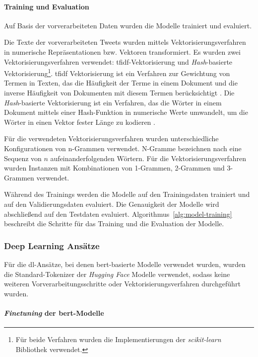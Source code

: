 \paragraph{Training und Evaluation}
Auf Basis der vorverarbeiteten Daten wurden die Modelle trainiert und evaluiert.

Die Texte der vorverarbeiteten Tweets wurden mittels Vektorisierungsverfahren in numerische Repräsentationen bzw. Vektoren transformiert.
Es wurden zwei Vekto\-risierungs\-verfahren verwendet: \gls{tfidf}-Vek\-to\-ri\-sie\-rung und \textit{Hash}-basierte Vektorisierung\footnote{Für beide Verfahren wurden die Implementierungen der \textit{scikit-learn} Bibliothek verwendet.}.
\gls{tfidf} Vektorisierung ist ein Verfahren zur Gewichtung von Termen in Texten, das die Häufigkeit der Terme in einem Dokument und die inverse Häufigkeit von Dokumenten mit diesem Termen berücksichtigt \cite[S. 119]{manning2009introduction}.
Die \textit{Hash}-basierte Vektorisierung ist ein Verfahren, das die Wörter in einem Dokument mittels einer Hash-Funktion in numerische Werte umwandelt, um die Wörter in einen Vektor fester Länge zu kodieren \cite{sklearnextraction2025}.

Für die verwendeten Vektorisierungsverfahren wurden unterschiedliche Konfigurationen von n-Grammen verwendet.
N-Gramme bezeichnen nach \cite[S.33]{jm3} eine Sequenz von $n$ aufeinanderfolgenden Wörtern.
Für die Vektorisierungsverfahren wurden Instanzen mit Kombinationen von 1-Grammen, 2-Grammen und 3-Grammen verwendet.

Während des Trainings werden die Modelle auf den Trainingsdaten trainiert und auf den Validierungsdaten evaluiert.
Die Genauigkeit der Modelle wird abschließend auf den Testdaten evaluiert.
Algorithmus~\ref{alg:model-training} beschreibt die Schritte für das Training und die Evaluation der Modelle.

\subsubsection{Deep Learning Ansätze} \label{subsubsec:experimente-deep-learning-ansaetze}

Für die \gls{dl}-Ansätze, bei denen \gls{bert}-basierte Modelle verwendet wurden, wurden die Standard-Tokenizer der \textit{Hugging Face} Modelle verwendet, sodass keine weiteren Vorverarbeitungsschritte oder Vektorisierungsverfahren durchgeführt wurden.

\paragraph{\textit{Finetuning} der \gls{bert}-Modelle}

